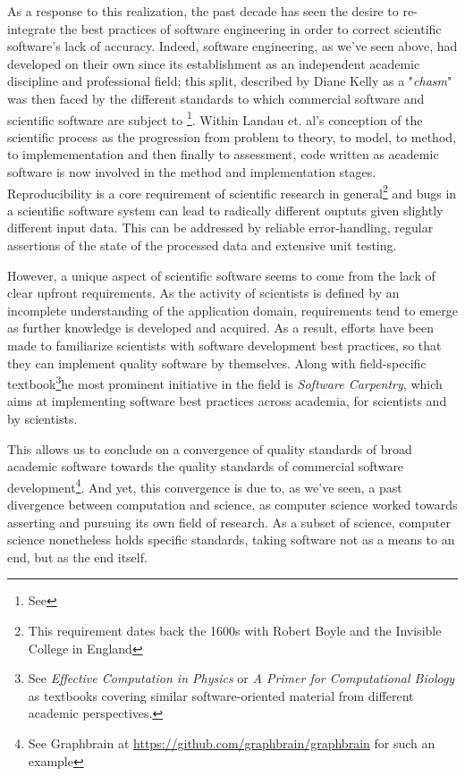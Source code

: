 As a response to this realization, the past decade has seen the desire to re-integrate the best practices of software engineering in order to correct scientific software's lack of accuracy\cite{hatton_how_1994}. Indeed, software engineering, as we've seen above, had developed on their own since its establishment as an independent academic discipline and professional field; this split, described by Diane Kelly as a "\emph{chasm}"\cite{kelly_software_2007} was then faced by the different standards to which commercial software and scientific software are subject to \footnote{See }. Within Landau et. al's conception of the scientific process as the progression from problem to theory, to model, to method, to implemementation and then finally to assessment\cite{landau_survey_2011}, code written as academic software is now involved in the method and implementation stages. Reproducibility is a core requirement of scientific research in general\footnote{This requirement dates back the 1600s with Robert Boyle and the Invisible College in England\cite{leveque_reproducible_2012}} and bugs in a scientific software system can lead to radically different ouptuts given slightly different input data. This can be addressed by reliable error-handling, regular assertions of the state of the processed data and extensive unit testing\cite{wilson_best_2014}.

However, a unique aspect of scientific software seems to come from the lack of clear upfront requirements. As the activity of scientists is defined by an incomplete understanding of the application domain, requirements tend to emerge as further knowledge is developed and acquired\cite{segal_when_2005}. As a result, efforts have been made to familiarize scientists with software development best practices, so that they can implement quality software by themselves. Along with field-specific textbook\footnote{See \emph{Effective Computation in Physics}\cite{scopatz_effective_2015} or \emph{A Primer for Computational Biology}\cite{oneil_primer_2019} as textbooks covering similar software-oriented material from different academic perspectives.}he most prominent initiative in the field is \emph{Software Carpentry}, which aims at implementing software best practices across academia, for scientists and by scientists.

This allows us to conclude on a convergence of quality standards of broad academic software towards the quality standards of commercial software development\footnote{See Graphbrain at \url{https://github.com/graphbrain/graphbrain} for such an example}.  And yet, this convergence is due to, as we've seen, a past divergence between computation and science, as computer science worked towards asserting and pursuing its own field of research. As a subset of science, computer science nonetheless holds specific standards, taking software not as a means to an end, but as the end itself.

